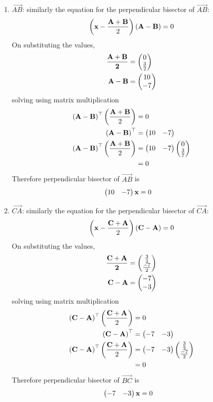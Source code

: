 \documentclass[11pt]{book}
\begin{document}
\begin{enumerate}[label=\thesection.\arabic*.,ref=\thesection.\theenumi]
\begin{enumerate}
  \item $\vec{AB}$: similarly the equation for the perpendicular bisector of $\vec{AB}$:
\begin{align}
    \left(\mathbf{x}-\frac{\mathbf{A}+\mathbf{B}}{2}\right)\left(\mathbf{A}-\mathbf{B}\right) = 0
\end{align}
On substituting the values,
\begin{align}
    \mathbf{\frac{\mathbf{A}+\mathbf{B}}{2}} &= \begin{pmatrix}0 \\ \frac{3}{2}\end{pmatrix} \\
\mathbf{A}-\mathbf{B} &= \begin{pmatrix}10 \\ -7\end{pmatrix} \\
\end{align}
solving using matrix multiplication
\begin{align}
\left(\mathbf{A}-\mathbf{B}\right)^{\top}\left(\frac{\mathbf{A}+\mathbf{B}}{2}\right)&=0 \\
\left(\mathbf{A}-\mathbf{B}\right)^{\top} &= \begin{pmatrix}10 & -7\end{pmatrix} \\
\left(\mathbf{A}-\mathbf{B}\right)^{\top}\left(\frac{\mathbf{A}+\mathbf{B}}{2}\right)&=\begin{pmatrix}10 & -7\end{pmatrix}\begin{pmatrix}0 \\ \frac{3}{7}\end{pmatrix}\\
&= 0
\end{align}
Therefore perpendicular bisector of $\vec{AB}$ is
\begin{align}
    \begin{pmatrix}10 & -7\end{pmatrix}\mathbf{x}&= 0
\end{align}

  \item $\vec{CA}$: similarly the equation for the perpendicular bisector of $\vec{CA}$:
\begin{align}
    \left(\mathbf{x}-\frac{\mathbf{C}+\mathbf{A}}{2}\right)\left(\mathbf{C}-\mathbf{A}\right) = 0
\end{align}
On substituting the values,
\begin{align}
    \mathbf{\frac{\mathbf{C}+\mathbf{A}}{2}} &= \begin{pmatrix}\frac{3}{2} \\ \frac{-7}{2}\end{pmatrix} \\
\mathbf{C}-\mathbf{A} &= \begin{pmatrix}-7 \\ -3\end{pmatrix} \\
\end{align}
solving using matrix multiplication
\begin{align}
\left(\mathbf{C}-\mathbf{A}\right)^{\top}\left(\frac{\mathbf{C}+\mathbf{A}}{2}\right)&=0 \\
\left(\mathbf{C}-\mathbf{A}\right)^{\top} &= \begin{pmatrix}-7 & -3\end{pmatrix} \\
\left(\mathbf{C}-\mathbf{A}\right)^{\top}\left(\frac{\mathbf{C}+\mathbf{A}}{2}\right)&=\begin{pmatrix}-7 & -3\end{pmatrix}\begin{pmatrix}\frac{3}{2} \\ \frac{-7}{2}\end{pmatrix}\\
&= 0
\end{align}
Therefore perpendicular bisector of $\vec{BC}$ is
\begin{align}
    \begin{pmatrix}-7 & -3\end{pmatrix}\mathbf{x}&= 0
\end{align}
\end{enumerate}


\end{enumerate}
\end{document}
